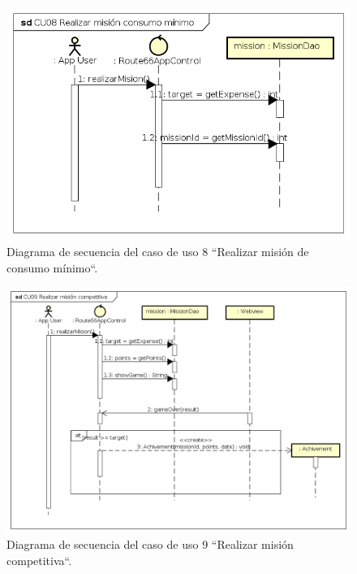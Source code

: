 \documentclass[twoside]{report}
\begin{document}
\begin{figure}[H]
\begin{center}
\includegraphics[scale=0.65]{images/sequence/CU8}
\caption{Diagrama de secuencia del caso de uso 8  “Realizar misión de consumo mínimo“.}
\end{center}
\end{figure}

\begin{figure}[H]
\begin{center}
\includegraphics[scale=0.5]{images/sequence/CU9}
\caption{Diagrama de secuencia del caso de uso 9 “Realizar misión competitiva“.}
\end{center}
\end{figure}
\end{document}
